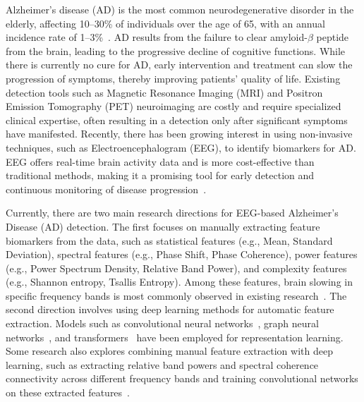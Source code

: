 



Alzheimer's disease (AD) is the most common neurodegenerative disorder in the elderly, affecting 10–30\% of individuals over the age of 65, with an annual incidence rate of 1–3\%~\cite{breijyeh2020comprehensive,masters2015alzheimer}. AD results from the failure to clear amyloid-$\beta$ peptide from the brain, leading to the progressive decline of cognitive functions. While there is currently no cure for AD, early intervention and treatment can slow the progression of symptoms, thereby improving patients' quality of life\cite{nelson2015slowing,chu2012alzheimer}. Existing detection tools such as Magnetic Resonance Imaging (MRI) and Positron Emission Tomography (PET) neuroimaging are costly and require specialized clinical expertise, often resulting in a detection only after significant symptoms have manifested. Recently, there has been growing interest in using non-invasive techniques, such as Electroencephalogram (EEG), to identify biomarkers for AD. EEG offers real-time brain activity data and is more cost-effective than traditional methods, making it a promising tool for early detection and continuous monitoring of disease progression~\cite{ieracitano2019convolutional}.



Currently, there are two main research directions for EEG-based Alzheimer's Disease (AD) detection. The first focuses on manually extracting feature biomarkers from the data, such as statistical features (e.g., Mean, Standard Deviation)\cite{tzimourta2019eeg, tzimourta2019analysis}, spectral features (e.g., Phase Shift, Phase Coherence)\cite{wang2017enhanced, cassani2014effects}, power features (e.g., Power Spectrum Density, Relative Band Power)\cite{fahimi2017index, schmidt2013index}, and complexity features (e.g., Shannon entropy, Tsallis Entropy)\cite{garn2015quantitative, azami2019multiscale}. Among these features, brain slowing in specific frequency bands is most commonly observed in existing research~\cite{abasolo2005analysis, fahimi2017index}. The second direction involves using deep learning methods for automatic feature extraction. Models such as convolutional neural networks~\cite{li2022predictive, cura2022deep}, graph neural networks~\cite{shan2022spatial, klepl2023adaptive}, and transformers~\cite{wang2024adformer} have been employed for representation learning. Some research also explores combining manual feature extraction with deep learning, such as extracting relative band powers and spectral coherence connectivity across different frequency bands and training convolutional networks on these extracted features~\cite{miltiadous2023dice}.


